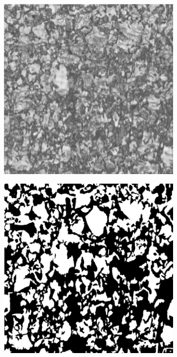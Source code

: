 \documentclass{article}
\begin{document}
\begin{figure}[h!]
     \centering
     \begin{subfigure}[b]{0.3\textwidth}
         \centering
         \includegraphics[width=\textwidth]{Micro1_980.png}
         \caption{}
         \label{fig:Micro1_980}
     \end{subfigure}
     \hfill
     \begin{subfigure}[b]{0.3\textwidth}
         \centering
         \includegraphics[width=\textwidth]{Micro2_980.png}

\end{subfigure}
\end{figure}
\end{document}
